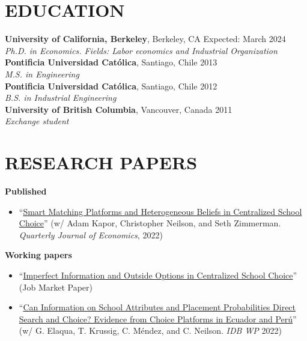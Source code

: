 \documentclass[letter,9pt]{extarticle}
\begin{document}
\section*{EDUCATION}
\textbf{University of California, Berkeley}, Berkeley, CA \hfill  Expected: March 2024\\ %
\textit{Ph.D. in Economics. Fields: Labor economics and Industrial Organization}\vspace{.1cm}\\ %
\textbf{Pontificia Universidad Católica}, Santiago, Chile \hfill  2013\\ %
\textit{M.S. in Engineering}\vspace{.1cm}\\   %
\textbf{Pontificia Universidad Católica}, Santiago, Chile \hfill  2012\\ %
\textit{B.S. in Industrial Engineering}\vspace{.1cm}\\   %
\textbf{University of British Columbia}, Vancouver, Canada \hfill  2011\\ %
\textit{Exchange student}   %

\section*{RESEARCH PAPERS}

\noindent
\textbf{Published}
\begin{itemize}
    \item ``\href{https://academic.oup.com/qje/article/137/3/1791/6544686?login=false}{Smart Matching Platforms and Heterogeneous Beliefs in Centralized School Choice}'' (w/ Adam Kapor, Christopher Neilson, and Seth Zimmerman. \textit{Quarterly Journal of Economics}, 2022)    \end{itemize}
\noindent
\textbf{Working papers} 
\begin{itemize}
    \item ``\href{https://fharteaga.github.io/pdfs/arteagaJMP.pdf}{Imperfect Information and Outside Options in Centralized School Choice}''  (Job Market Paper)
    \item ``\href{https://publications.iadb.org/en/can-information-school-attributes-and-placement-probabilities-direct-search-and-choice-evidence}{Can Information on School Attributes and Placement Probabilities Direct Search and Choice? Evidence from Choice Platforms in Ecuador and Perú}'' (w/ G. Elaqua, T. Krussig, C. Méndez, and C. Neilson. \textit{IDB WP} 2022)
\end{itemize}
\end{document}
